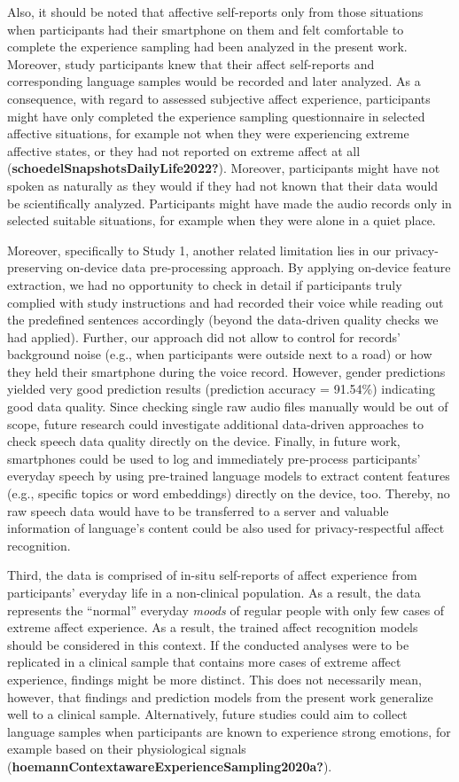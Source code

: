\documentclass[
  english,
  man,floatsintext]{apa6}
\begin{document}
Also, it should be noted that affective self-reports only from those situations when participants had their smartphone on them and felt comfortable to complete the experience sampling had been analyzed in the present work. Moreover, study participants knew that their affect self-reports and corresponding language samples would be recorded and later analyzed. As a consequence, with regard to assessed subjective affect experience, participants might have only completed the experience sampling questionnaire in selected affective situations, for example not when they were experiencing extreme affective states, or they had not reported on extreme affect at all (\textbf{schoedelSnapshotsDailyLife2022?}). Moreover, participants might have not spoken as naturally as they would if they had not known that their data would be scientifically analyzed. Participants might have made the audio records only in selected suitable situations, for example when they were alone in a quiet place.

Moreover, specifically to Study 1, another related limitation lies in our privacy-preserving on-device data pre-processing approach. By applying on-device feature extraction, we had no opportunity to check in detail if participants truly complied with study instructions and had recorded their voice while reading out the predefined sentences accordingly (beyond the data-driven quality checks we had applied). Further, our approach did not allow to control for records' background noise (e.g., when participants were outside next to a road) or how they held their smartphone during the voice record. However, gender predictions yielded very good prediction results (prediction accuracy = 91.54\%) indicating good data quality. Since checking single raw audio files manually would be out of scope, future research could investigate additional data-driven approaches to check speech data quality directly on the device. Finally, in future work, smartphones could be used to log and immediately pre-process participants' everyday speech by using pre-trained language models to extract content features (e.g., specific topics or word embeddings) directly on the device, too. Thereby, no raw speech data would have to be transferred to a server and valuable information of language's content could be also used for privacy-respectful affect recognition.

Third, the data is comprised of in-situ self-reports of affect experience from participants' everyday life in a non-clinical population. As a result, the data represents the ``normal'' everyday \emph{moods} of regular people with only few cases of extreme affect experience. As a result, the trained affect recognition models should be considered in this context. If the conducted analyses were to be replicated in a clinical sample that contains more cases of extreme affect experience, findings might be more distinct. This does not necessarily mean, however, that findings and prediction models from the present work generalize well to a clinical sample. Alternatively, future studies could aim to collect language samples when participants are known to experience strong emotions, for example based on their physiological signals (\textbf{hoemannContextawareExperienceSampling2020a?}).
\end{document}
